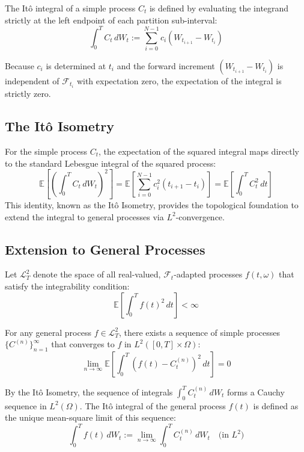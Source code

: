 \documentclass[11pt]{amsart}
\theoremstyle{plain}
\theoremstyle{definition}
\theoremstyle{remark}
\numberwithin{equation}{section}
\begin{document}
{The Itô integral of a simple process $C_t$ is defined by evaluating the integrand strictly at the left endpoint of each partition sub-interval:
\begin{equation}
    \int_0^T C_t \, dW_t := \sum_{i=0}^{N-1} c_i (W_{t_{i+1}} - W_{t_i})
\end{equation}

Because $c_i$ is determined at $t_i$ and the forward increment $(W_{t_{i+1}} - W_{t_i})$ is independent of $\mathcal{F}_{t_i}$ with expectation zero, the expectation of the integral is strictly zero.

\subsection{The Itô Isometry}
For the simple process $C_t$, the expectation of the squared integral maps directly to the standard Lebesgue integral of the squared process:
\begin{equation}
    \mathbb{E}\left[ \left( \int_0^T C_t \, dW_t \right)^2 \right] = \mathbb{E}\left[ \sum_{i=0}^{N-1} c_i^2 (t_{i+1} - t_i) \right] = \mathbb{E}\left[ \int_0^T C_t^2 \, dt \right]
\end{equation}
This identity, known as the Itô Isometry, provides the topological foundation to extend the integral to general processes via $L^2$-convergence.

\subsection{Extension to General Processes}
Let $\mathcal{L}^2_T$ denote the space of all real-valued, $\mathcal{F}_t$-adapted processes $f(t, \omega)$ that satisfy the integrability condition:
\begin{equation}
    \mathbb{E}\left[ \int_0^T f(t)^2 \, dt \right] < \infty
\end{equation}

For any general process $f \in \mathcal{L}^2_T$, there exists a sequence of simple processes $\{C^{(n)}\}_{n=1}^\infty$ that converges to $f$ in $L^2([0,T] \times \Omega)$:
\begin{equation}
    \lim_{n \to \infty} \mathbb{E}\left[ \int_0^T (f(t) - C^{(n)}_t)^2 \, dt \right] = 0
\end{equation}

By the Itô Isometry, the sequence of integrals $\int_0^T C^{(n)}_t \, dW_t$ forms a Cauchy sequence in $L^2(\Omega)$. The Itô integral of the general process $f(t)$ is defined as the unique mean-square limit of this sequence:
\begin{equation}
    \int_0^T f(t) \, dW_t := \lim_{n \to \infty} \int_0^T C^{(n)}_t \, dW_t \quad \text{(in } L^2\text{)}
\end{equation}

}
\end{document}

